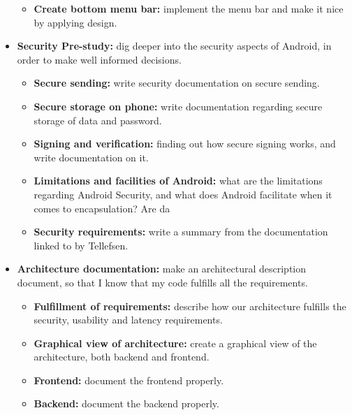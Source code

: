 \begin{itemize}
\begin{itemize}
\item{}\textbf{Create bottom menu bar:} implement the menu bar and make it nice by applying design.
\end{itemize}
\item{}\textbf{Security Pre-study:} dig deeper into the security aspects of Android, in order to make well informed decisions.
\begin{itemize}
\item{}\textbf{Secure sending:} write security documentation on secure sending.
\item{}\textbf{Secure storage on phone:} write documentation regarding secure storage of data and password.
\item{}\textbf{Signing and verification:} finding out how secure signing works, and write documentation on it.
\item{}\textbf{Limitations and facilities of Android:} what are the limitations regarding Android Security, and what does Android facilitate when it comes to encapsulation? Are da
\item{}\textbf{Security requirements:} write a summary from the documentation linked to by Tellefsen.
\end{itemize}
\item{}\textbf{Architecture documentation:} make an architectural description document, so that I know that my code fulfills all the requirements.
\begin{itemize}
\item{}\textbf{Fulfillment of requirements:} describe how our architecture fulfills the security, usability and latency requirements.
\item{}\textbf{Graphical view of architecture:} create a graphical view of the architecture, both backend and frontend.
\item{}\textbf{Frontend:} document the frontend properly.
\item{}\textbf{Backend:} document the backend properly.
\end{itemize}
\end{itemize}
